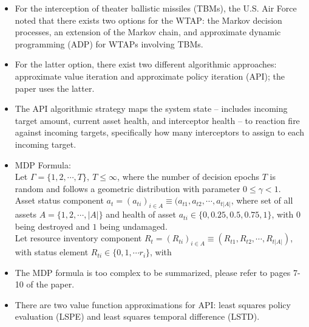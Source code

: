 \documentclass[12pt]{article} %
\renewcommand\le{\leqslant}
\begin{document}
\begin{itemize}
    \item For the interception of theater ballistic missiles (TBMs), the U.S. Air Force noted that there exists two options for the WTAP: the Markov decision processes, an extension of the Markov chain, and approximate dynamic programming (ADP) for WTAPs involving TBMs.
    \item For the latter option, there exist two different algorithmic approaches: approximate value iteration and approximate policy iteration (API); the paper uses the latter.
    \item The API algorithmic strategy maps the system state -- includes incoming target amount, current asset health, and interceptor health -- to reaction fire against incoming targets, specifically how many interceptors to assign to each incoming target.
    \item MDP Formula:\\
    Let $\Gamma = \{1, 2, \cdots, T\},\ T \le \infty$, where the number of decision epochs $T$ is random and follows a geometric distribution with parameter $0 \le \gamma < 1$. \\Asset status component $a_t = (a_{ti})_{i\in A}\equiv (a_{t1}, a_{t2}, \cdots, a_{t|A|}$, where set of all assets $A = \{1, 2, \cdots, |A|\}$ and health of asset $a_{ti} \in \{0, 0.25, 0.5, 0.75, 1\}$, with $0$ being destroyed and $1$ being undamaged. \\
    Let resource inventory component $R_t = (R_{ti})_{i\in A} \equiv (R_{t1}, R_{t2}, \cdots, R_{t|A|})$, with status element $R_{ti} \in \{0,1,\cdots r_i\}$, with
    \item The MDP formula is too complex to be summarized, please refer to pages 7-10 of the paper.
    \item There are two value function approximations for API: least squares policy evaluation (LSPE) and least squares temporal difference (LSTD).\\
    \vspace{-0.25cm}

\end{itemize}
\end{document}
